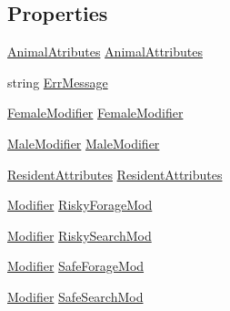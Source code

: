 \subsection*{Properties}
\begin{DoxyCompactItemize}
\item 
\hyperlink{class_s_e_a_r_c_h_1_1_animal_atributes}{Animal\-Atributes} \hyperlink{class_s_e_a_r_c_h_1_1_animal_manager_a8349d00f52614df2284bb8ffba935b9c}{Animal\-Attributes}
\item 
string \hyperlink{class_s_e_a_r_c_h_1_1_animal_manager_acc1cd13b6562447578772c34c0db2f6d}{Err\-Message}
\item 
\hyperlink{class_s_e_a_r_c_h_1_1_female_modifier}{Female\-Modifier} \hyperlink{class_s_e_a_r_c_h_1_1_animal_manager_a40397d04d9d33fe1ee68b401f3e2c2b0}{Female\-Modifier}
\item 
\hyperlink{class_s_e_a_r_c_h_1_1_male_modifier}{Male\-Modifier} \hyperlink{class_s_e_a_r_c_h_1_1_animal_manager_a104145af738786e1ff56fad9bbfffe8f}{Male\-Modifier}
\item 
\hyperlink{class_s_e_a_r_c_h_1_1_resident_attributes}{Resident\-Attributes} \hyperlink{class_s_e_a_r_c_h_1_1_animal_manager_a4a34a6f225d2b9ba7adf762583ba6ec0}{Resident\-Attributes}
\item 
\hyperlink{class_s_e_a_r_c_h_1_1_modifier}{Modifier} \hyperlink{class_s_e_a_r_c_h_1_1_animal_manager_a7c95f633caf112e185d2059bad7b21b5}{Risky\-Forage\-Mod}
\item 
\hyperlink{class_s_e_a_r_c_h_1_1_modifier}{Modifier} \hyperlink{class_s_e_a_r_c_h_1_1_animal_manager_abcaa8f634b294977cbeb077717ed8961}{Risky\-Search\-Mod}
\item 
\hyperlink{class_s_e_a_r_c_h_1_1_modifier}{Modifier} \hyperlink{class_s_e_a_r_c_h_1_1_animal_manager_a38061cc4a1441dc32e0d76d067439206}{Safe\-Forage\-Mod}
\item 
\hyperlink{class_s_e_a_r_c_h_1_1_modifier}{Modifier} \hyperlink{class_s_e_a_r_c_h_1_1_animal_manager_a1343854b00d8b64b3ab607f8aaf75795}{Safe\-Search\-Mod}
\end{DoxyCompactItemize}


